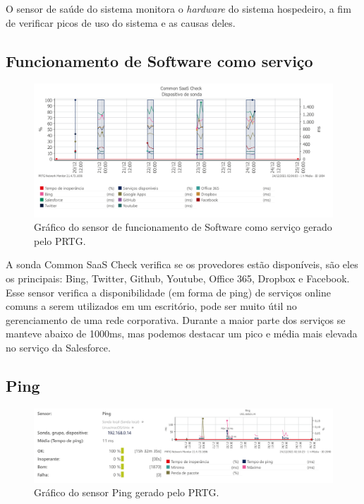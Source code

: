 \documentclass[12pt]{article}
\begin{document}
O sensor de saúde do sistema monitora o \emph{hardware} do sistema hospedeiro, a fim de verificar picos de uso do sistema e as causas deles.

\subsection{Funcionamento de Software como serviço}

\begin{figure}[H]
    \includegraphics[width=\linewidth]{saas.png}
    \caption{Gráfico do sensor de funcionamento de Software como serviço gerado pelo PRTG.}
\end{figure}

A sonda Common SaaS Check verifica se os provedores estão disponíveis, são eles os principais: Bing, Twitter, Github, Youtube, Office 365, Dropbox e Facebook. Esse sensor verifica a disponibilidade (em forma de ping) de serviços online comuns a serem utilizados em um escritório, pode ser muito útil no gerenciamento de uma rede corporativa. Durante a maior parte dos serviços se manteve abaixo de 1000ms, mas podemos destacar um pico e média mais elevada no serviço da Salesforce.

\subsection{Ping}

\begin{figure}[H]
    \includegraphics[width=\linewidth]{ping.png}
    \caption{Gráfico do sensor Ping gerado pelo PRTG.}
\end{figure}
\end{document}
